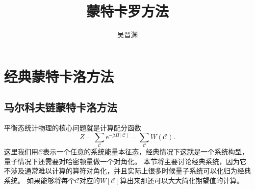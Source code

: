 \documentclass[hyperref, UTF8, a4paper]{ctexart}
\title{蒙特卡罗方法}
\author{吴晋渊}
\newcommand*{\ee}{\mathrm{e}}
\begin{document}
\maketitle

\section{经典蒙特卡洛方法}

\subsection{马尔科夫链蒙特卡洛方法}\label{sec:mcmc-method}

平衡态统计物理的核心问题就是计算配分函数
\begin{equation}
    Z = \sum_\mathcal{C} \ee^{-\beta H[\mathcal{C}]} = \sum_\mathcal{C} W(\mathcal{C}).
    \label{eq:partition-function}
\end{equation}
这里我们用$\mathcal{C}$表示一个任意的系统能量本征态，经典情况下这就是一个系统构型，量子情况下还需要对哈密顿量做一个对角化。
本节将主要讨论经典系统，因为它不涉及通常难以计算的算符对角化，并且实际上很多时候量子系统可以化归为经典系统。
如果能够将每个$\mathcal{C}$对应的$W[\mathcal{C}]$算出来那还可以大大简化期望值的计算。
\end{document}
